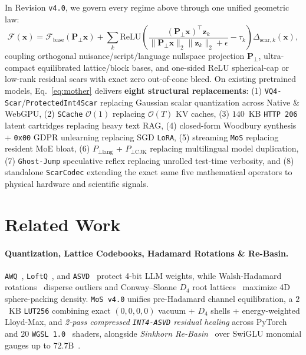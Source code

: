 \documentclass[10pt,twocolumn]{article}
\begin{document}
In Revision \texttt{v4.0}, we govern every regime above through one unified geometric law:
\begin{equation}
    \mathcal{F}(\mathbf{x}) = \mathcal{F}_{\text{base}}(\mathbf{P}_\perp \mathbf{x}) + \sum_{k} \mathrm{ReLU}\!\left(\frac{(\mathbf{P}_\perp \mathbf{x})^\top \mathbf{z}_k}{\|\mathbf{P}_\perp \mathbf{x}\|_2 \|\mathbf{z}_k\|_2 + \epsilon} - \tau_k\right) \Delta_{\text{scar},k}(\mathbf{x}),
    \label{eq:mother}
\end{equation}
coupling orthogonal nuisance/script/language nullspace projection $\mathbf{P}_\perp$, ultra-compact equilibrated lattice/block bases, and one-sided $\mathrm{ReLU}$ spherical-cap or low-rank residual scars with exact zero out-of-cone bleed. On existing pretrained models, Eq.~\eqref{eq:mother} delivers \textbf{eight structural replacements}: (1) \texttt{VQ4-Scar}/\texttt{ProtectedInt4Scar} replacing Gaussian scalar quantization across Native \& WebGPU, (2) \texttt{SCache} $\mathcal{O}(1)$ replacing $\mathcal{O}(T)$ KV caches, (3) $140$~KB \texttt{HTTP 206} latent cartridges replacing heavy text RAG, (4) closed-form Woodbury synthesis + \texttt{0x00} GDPR unlearning replacing SGD \texttt{LoRA}, (5) streaming \texttt{MoS} replacing resident MoE bloat, (6) $P_{\perp\text{lang}}$ + $P_{\perp\text{CJK}}$ replacing multilingual model duplication, (7) \texttt{Ghost-Jump} speculative reflex replacing unrolled test-time verbosity, and (8) standalone \texttt{ScarCodec} extending the exact same five mathematical operators to physical hardware and scientific signals.

\section{Related Work}
\paragraph{Quantization, Lattice Codebooks, Hadamard Rotations \& Re-Basin.}
\texttt{AWQ}~\citep{lin2024awq}, \texttt{LoftQ}~\citep{li2024loftq}, and \texttt{ASVD}~\citep{yuan2023asvd} protect 4-bit LLM weights, while Walsh-Hadamard rotations~\citep{walsh1923closed} disperse outliers and Conway--Sloane $D_4$ root lattices~\citep{conway1982fast} maximize 4D sphere-packing density. \texttt{MoS v4.0} unifies pre-Hadamard channel equilibration, a $2$~KB \texttt{LUT256} combining exact $(0,0,0,0)$ vacuum + $D_4$ shells + energy-weighted Lloyd-Max, and \emph{2-pass compressed \texttt{INT4-ASVD} residual healing} across PyTorch and $20$ \texttt{WGSL 1.0}~\citep{w3c2024webgpu} shaders, alongside \emph{Sinkhorn Re-Basin}~\citep{ainsworth2023git,sinkhorn1967concerning} over SwiGLU monomial gauges up to $72.7\text{B}$~\citep{marchenko1967distribution}.
\end{document}
